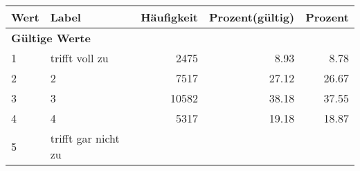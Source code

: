      \begin{longtable}{lXrrr}
     \toprule
     \textbf{Wert} & \textbf{Label} & \textbf{Häufigkeit} & \textbf{Prozent(gültig)} & \textbf{Prozent} \\
     \endhead
     \midrule
     \multicolumn{5}{l}{\textbf{Gültige Werte}}\\

     1 &
     \multicolumn{1}{X}{ trifft voll zu   } &


       \num{2475} &
       \num[round-mode=places,round-precision=2]{8.93} &
         \num[round-mode=places,round-precision=2]{8.78} \\

     2 &
     \multicolumn{1}{X}{ 2   } &


       \num{7517} &
       \num[round-mode=places,round-precision=2]{27.12} &
         \num[round-mode=places,round-precision=2]{26.67} \\

     3 &
     \multicolumn{1}{X}{ 3   } &


       \num{10582} &
       \num[round-mode=places,round-precision=2]{38.18} &
         \num[round-mode=places,round-precision=2]{37.55} \\

     4 &
     \multicolumn{1}{X}{ 4   } &


       \num{5317} &
       \num[round-mode=places,round-precision=2]{19.18} &
         \num[round-mode=places,round-precision=2]{18.87} \\

     5 &
     \multicolumn{1}{X}{ trifft gar nicht zu   } &



\end{longtable}
